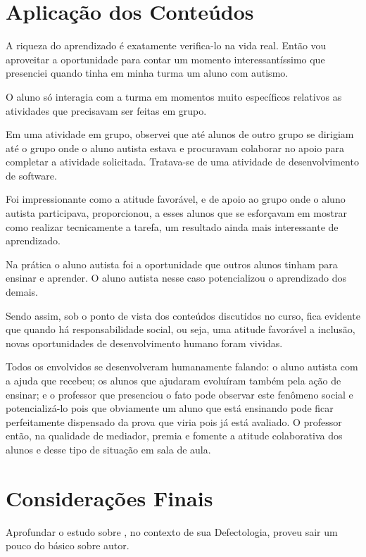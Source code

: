 \documentclass{../../common-shared/cls/Article_Class_RevInfor}
\begin{document}
\section{Aplicação dos Conteúdos}

A riqueza do aprendizado é exatamente verifica-lo na vida real. Então vou aproveitar a oportunidade para contar um momento interessantíssimo que presenciei quando tinha em minha turma um aluno com autismo.

O aluno só interagia com a turma em momentos muito específicos relativos as atividades que precisavam ser feitas em grupo.

Em uma atividade em grupo, observei que até alunos de outro grupo se dirigiam até o grupo onde o aluno autista estava e procuravam colaborar no apoio para completar a atividade solicitada. Tratava-se de uma atividade de desenvolvimento de software.

Foi impressionante como a atitude favorável, e de apoio ao grupo onde o aluno autista participava, proporcionou, a esses alunos que se esforçavam em mostrar como realizar tecnicamente a tarefa, um resultado ainda mais interessante de aprendizado.

Na prática o aluno autista foi a oportunidade que outros alunos tinham para ensinar e aprender. O aluno autista nesse caso potencializou o aprendizado dos demais.

Sendo assim, sob o ponto de vista dos conteúdos discutidos no curso, fica evidente que quando há responsabilidade social, ou seja, uma atitude favorável a inclusão, novas oportunidades de desenvolvimento humano foram vividas.

Todos os envolvidos se desenvolveram humanamente falando: o aluno autista com a ajuda que recebeu; os alunos que ajudaram evoluíram também pela ação de ensinar; e o professor que presenciou o fato pode observar este fenômeno social e potencializá-lo pois que obviamente um aluno que está ensinando pode ficar perfeitamente dispensado da prova que viria pois já está avaliado. O professor então, na qualidade de mediador, premia e fomente a atitude colaborativa dos alunos e desse tipo de situação em sala de aula.

\section{Considerações Finais}

Aprofundar o estudo sobre \Vig{}, no contexto de sua Defectologia,
proveu sair um pouco do básico sobre autor.
\end{document}

